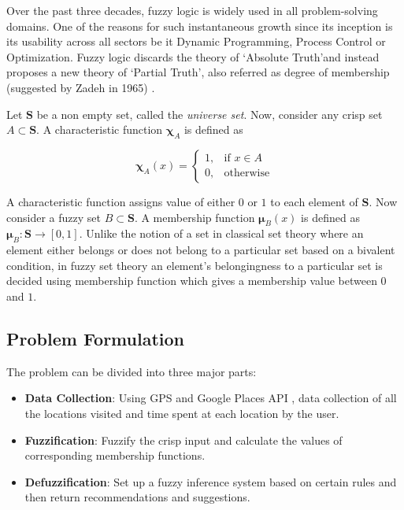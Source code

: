 \documentclass[conference]{IEEEtran}
\begin{document}
Over the past three decades, fuzzy logic is widely used in all problem-solving domains. One of the reasons for such instantaneous growth since its inception is its usability across all sectors be it Dynamic Programming, Process Control or Optimization. Fuzzy logic discards the theory of \lq Absolute Truth\rq and instead proposes a new theory of \lq Partial Truth\rq, also referred as degree of membership (suggested by Zadeh in 1965) \cite{IEEEhowto:zadeh}.

Let $\mathbf{S}$ be a non empty set, called the \textit{universe set}. Now, consider any crisp set $A \subset \mathbf{S}$. A characteristic function $\mathbold{\chi}_A$ is defined as

$$
\mathbold{\chi}_A(x) = 
\begin{cases}
    1, & \text{if } x\in A\\
    0, & \text{otherwise}
\end{cases}
$$

A characteristic function assigns value of either $0$ or $1$ to each element of $\mathbf{S}$. Now consider a fuzzy set $B \subset \mathbf{S}$. A membership function $\mathbold{\mu}_B(x)$ is defined as $\mathbold{\mu}_B:\mathbf{S}\rightarrow[0, 1]$. Unlike the notion of a set in classical set theory where an element either belongs or does not belong to a particular set based on a bivalent condition, in fuzzy set\cite{klir} theory an element\rq s belongingness to a particular set is decided using membership function which gives a membership value between $0$ and $1$.

\subsection{Problem Formulation}

The problem can be divided into three major parts:

\begin{itemize}
\item \textbf{Data Collection}: Using GPS and Google Places API \cite{maps}, data collection of all the locations visited and time spent at each location by the user.
\item \textbf{Fuzzification}: Fuzzify the crisp input and calculate the values of corresponding membership functions.
\item \textbf{Defuzzification}: Set up a fuzzy inference system based on certain rules and then return recommendations and suggestions.
\end{itemize}
\end{document}
